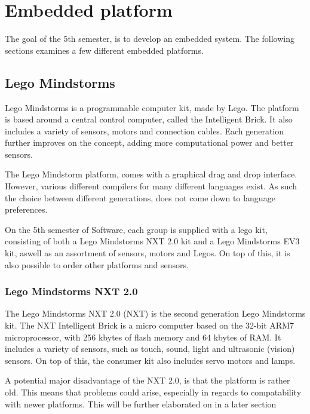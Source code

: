 \section{Embedded platform}
The goal of the 5th semester, is to develop an embedded system.
The following sections examines a few different embedded platforms.

\subsection{Lego Mindstorms}
Lego Mindstorms is a programmable computer kit, made by Lego.
The platform is based around a central control computer, called the Intelligent Brick.
It also includes a variety of sensors, motors and connection cables.
Each generation further improves on the concept, adding more computational power and better sensors.

The Lego Mindstorm platform, comes with a graphical drag and drop interface.
However, various different compilers for many different languages exist.
As such the choice between different generations, does not come down to language preferences.

On the 5th semester of Software, each group is supplied with a lego kit, consisting of both a Lego Mindstorms NXT 2.0 kit and a Lego Mindstorms EV3 kit, aswell as an assortment of sensors, motors and Legos.
On top of this, it is also possible to order other platforms and sensors.

\subsubsection{Lego Mindstorms NXT 2.0}
The Lego Mindstorms NXT 2.0 (NXT) is the second generation Lego Mindstorms kit.
The NXT Intelligent Brick is a micro computer based on the 32-bit ARM7 microprocessor, with 256 kbytes of flash memory and 64 kbytes of RAM\cite{nxt2userguide}.
It includes a variety of sensors, such as touch, sound, light and ultrasonic (vision) sensors.
On top of this, the consumer kit also includes servo motors and lamps.

A potential major disadvantage of the NXT 2.0, is that the platform is rather old.
This means that problems could arise, especially in regards to compatability with newer platforms.
This will be further elaborated on in a later section

